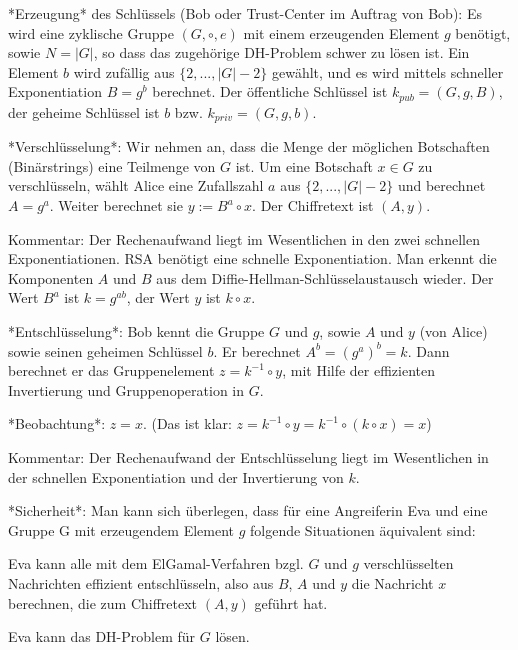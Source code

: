 \documentclass[a4paper]{article}
\begin{document}
\begin{multicols}{3}
        *Erzeugung* des Schlüssels (Bob oder Trust-Center im Auftrag von Bob): Es wird eine zyklische Gruppe $(G,\circ,e)$ mit einem erzeugenden Element $g$ benötigt, sowie $N=|G|$, so dass das zugehörige DH-Problem schwer zu lösen ist. Ein Element $b$ wird zufällig aus $\{2 ,...,|G|-2\}$ gewählt, und es wird mittels schneller Exponentiation $B=g^b$ berechnet. Der öffentliche Schlüssel ist $k_{pub}= (G,g,B)$, der geheime Schlüssel ist $b$ bzw. $k_{priv}=(G,g,b)$.

        *Verschlüsselung*: Wir nehmen an, dass die Menge der möglichen Botschaften (Binärstrings) eine Teilmenge von $G$ ist. Um eine Botschaft $x\in G$ zu verschlüsseln, wählt Alice eine Zufallszahl $a$ aus $\{2,...,|G|-2\}$ und berechnet $A=g^a$. Weiter berechnet sie $y:=B^a \circ x$. Der Chiffretext ist $(A,y)$.

        Kommentar: Der Rechenaufwand liegt im Wesentlichen in den zwei schnellen Exponentiationen. RSA benötigt eine schnelle Exponentiation. Man erkennt die Komponenten $A$ und $B$ aus dem Diffie-Hellman-Schlüsselaustausch wieder. Der Wert $B^a$ ist $k=g^{ab}$, der Wert $y$ ist $k\circ x$.

        *Entschlüsselung*: Bob kennt die Gruppe $G$ und $g$, sowie $A$ und $y$ (von Alice) sowie seinen geheimen Schlüssel $b$. Er berechnet $A^b= (g^a)^b=k$. Dann berechnet er das Gruppenelement $z=k^{-1}\circ y$, mit Hilfe der effizienten Invertierung und Gruppenoperation in $G$.

        *Beobachtung*: $z=x$. (Das ist klar: $z=k^{-1}\circ y=k^{-1}\circ(k\circ x) =x$)

        Kommentar: Der Rechenaufwand der Entschlüsselung liegt im Wesentlichen in der schnellen Exponentiation und der Invertierung von $k$.

        *Sicherheit*: Man kann sich überlegen, dass für eine Angreiferin Eva und eine Gruppe G mit erzeugendem Element $g$ folgende Situationen äquivalent sind:
        \begin{enumerate*}
            \item Eva kann alle mit dem ElGamal-Verfahren bzgl. $G$ und $g$ verschlüsselten Nachrichten effizient entschlüsseln, also aus $B$, $A$ und $y$ die Nachricht $x$ berechnen, die zum Chiffretext $(A,y)$ geführt hat.
            \item Eva kann das DH-Problem für $G$ lösen.
        \end{enumerate*}


\end{multicols}
\end{document}
